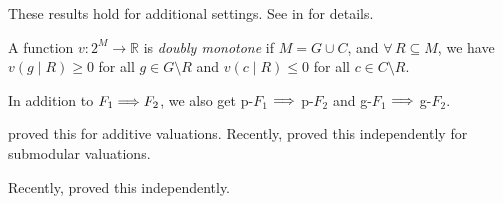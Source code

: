 \begin{table}[p]
\begin{tightenum}
\item[*] \label{foot:efx-to-ef1}These results hold for additional settings.
    See  in  for details.
\item[\textdagger] \label{foot:dbl-mono-1}A function $v: 2^M \to \mathbb{R}$ is \emph{doubly monotone}
    if $M = G \cup C$, and $\forall\,R \subseteq M$,
    we have $v(g \mid R) \ge 0$ for all $g \in G \setminus R$
    and $v(c \mid R) \le 0$ for all $c \in C \setminus R$.
\item[\textdaggerdbl] \label{foot:pg}In addition to $F_1 \Longrightarrow F_2$,
    we also get p-$F_1$ $\Longrightarrow$ p-$F_2$ and g-$F_1$ $\Longrightarrow$ g-$F_2$.
\item[\S] \label{foot:eef1-to-prop1}\citet{aziz2021fair} proved this for additive valuations.
    Recently, \citet{andersen2026computing} proved this independently for submodular valuations.
\item[\P] \label{foot:ef1-to-prop1-n2}Recently, \citet{andersen2026computing} proved this independently.
\end{tightenum}
\end{table}
\let\defaultFloatPlacement\oldFp
